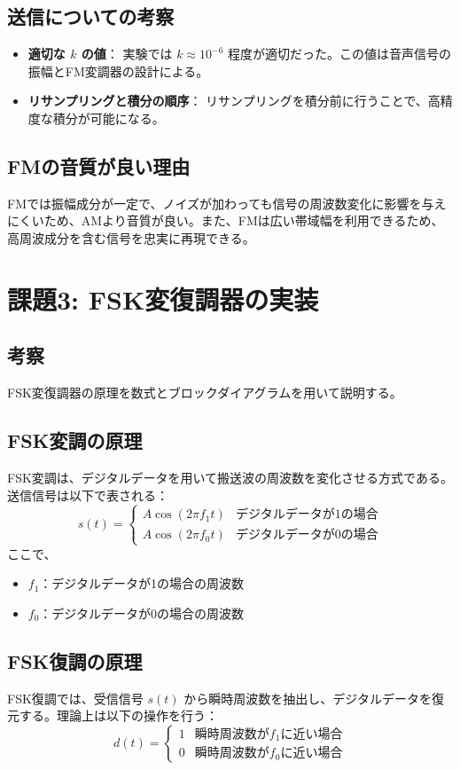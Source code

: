 \documentclass[a4paper, twocolumn]{article} %
\begin{document}
\subsection*{送信についての考察}
\begin{itemize}
    \item \textbf{適切な \(k\) の値}：
    実験では \(k \approx 10^{-6}\) 程度が適切だった。この値は音声信号の振幅とFM変調器の設計による。
    \item \textbf{リサンプリングと積分の順序}：
    リサンプリングを積分前に行うことで、高精度な積分が可能になる。
\end{itemize}

\subsection*{FMの音質が良い理由}
FMでは振幅成分が一定で、ノイズが加わっても信号の周波数変化に影響を与えにくいため、AMより音質が良い。また、FMは広い帯域幅を利用できるため、高周波成分を含む信号を忠実に再現できる。

\section*{課題3: FSK変復調器の実装}

\subsection*{考察}
FSK変復調器の原理を数式とブロックダイアグラムを用いて説明する。

\subsection*{FSK変調の原理}
FSK変調は、デジタルデータを用いて搬送波の周波数を変化させる方式である。送信信号は以下で表される：
\[
s(t) = 
\begin{cases} 
A \cos \left( 2 \pi f_1 t \right) & \text{デジタルデータが1の場合} \\
A \cos \left( 2 \pi f_0 t \right) & \text{デジタルデータが0の場合}
\end{cases}
\]
ここで、
\begin{itemize}
    \item \(f_1\)：デジタルデータが1の場合の周波数
    \item \(f_0\)：デジタルデータが0の場合の周波数
\end{itemize}

\subsection*{FSK復調の原理}
FSK復調では、受信信号 \(s(t)\) から瞬時周波数を抽出し、デジタルデータを復元する。理論上は以下の操作を行う：
\[
d(t) = 
\begin{cases} 
1 & \text{瞬時周波数が} f_1 \text{に近い場合} \\
0 & \text{瞬時周波数が} f_0 \text{に近い場合}
\end{cases}
\]
\end{document}
